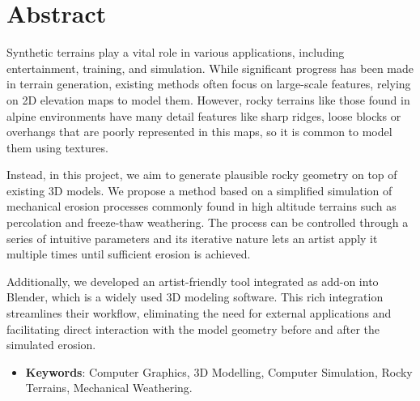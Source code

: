 
\chapter*{Abstract}

Synthetic terrains play a vital role in various applications, including entertainment, training, and simulation. While significant progress has been made in terrain generation, existing methods often focus on large-scale features, relying on 2D elevation maps to model them. However, rocky terrains like those found in alpine environments have many detail features like sharp ridges, loose blocks or overhangs that are poorly represented in this maps, so it is common to model them using textures. 

\vspace{0.5\baselineskip}
Instead, in this project, we aim to generate plausible rocky geometry on top of existing 3D models. We propose a method based on a simplified simulation of mechanical erosion processes commonly found in high altitude terrains such as percolation and freeze-thaw weathering. The process can be controlled through a series of intuitive parameters and its iterative nature lets an artist apply it multiple times until sufficient erosion is achieved.

\vspace{0.5\baselineskip}
Additionally, we developed an artist-friendly tool integrated as add-on into Blender, which is a widely used 3D modeling software. This rich integration streamlines their workflow, eliminating the need for external applications and facilitating direct interaction with the model geometry before and after the simulated erosion.

\vspace{0.5\baselineskip}
\begin{itemize}
    \item \textbf{Keywords}: Computer Graphics, 3D Modelling, Computer Simulation, Rocky Terrains, Mechanical Weathering.
\end{itemize}




